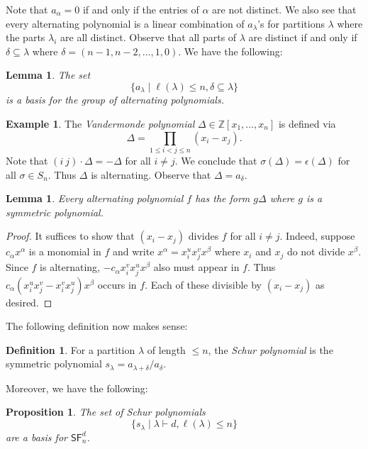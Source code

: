 \documentclass[12pt]{article}
\theoremstyle{plain}
\newtheorem{lemma}[theorem]{Lemma}
\newtheorem{proposition}[theorem]{Proposition}
\theoremstyle{definition}
\newtheorem{definition}[theorem]{Definition}
\newtheorem{example}[theorem]{Example}
\theoremstyle{remark}
\numberwithin{equation}{section}
\begin{document}
Note that $a_\alpha=0$ if and only if the entries of $\alpha$ are
not distinct.  We also see that every alternating polynomial is a linear
combination of $a_\lambda$'s for partitions $\lambda$ where the parts
$\lambda_i$ are all distinct.
Observe that all parts of $\lambda$ are distinct if and only if
$\delta \subseteq \lambda$ where
$\delta=(n-1,n-2,\ldots,1,0)$.
We have the following:

\begin{lemma}
The set
\[
\{ a_\lambda \mid \ell(\lambda) \le n, \delta \subseteq \lambda \}
\]
is a basis for the group of alternating polynomials.
\end{lemma}

\begin{example}
The \emph{Vandermonde polynomial} $\Delta \in \mathbb{Z}[x_1,\ldots,x_n]$
is defined via
\[
\Delta = \prod_{1 \le i < j \le n} (x_i-x_j).
\]
Note that $(i\ j) \cdot \Delta = -\Delta$ for all $i \ne j$.
We conclude that $\sigma(\Delta) = \epsilon(\Delta)$
for all $\sigma \in S_n$.
Thus $\Delta$ is alternating.
Observe that $\Delta=a_\delta$.
\end{example}

\begin{lemma}
Every alternating polynomial $f$ has the form $g \Delta$
where $g$ is a symmetric polynomial. 
\end{lemma}

\begin{proof}
It suffices to show that $(x_i-x_j)$ divides $f$ for all $i \ne j$.
Indeed, suppose $c_\alpha x^\alpha$ is a monomial in $f$
and write $x^\alpha = x_i^u x_j^v x^\beta$ where $x_i$ and $x_j$
do not divide $x^\beta$.
Since $f$ is alternating, $-c_\alpha x_i^v x_j^u x^\beta$
also must appear in $f$.
Thus $c_\alpha (x_i^u x_j^v - x_i^v x_j^u) x^\beta$ occurs in $f$.
Each of these divisible by $(x_i-x_j)$ as desired.
\end{proof}

The following definition now makes sense:

\begin{definition}
For a partition $\lambda$ of length $\le n$, the \emph{Schur polynomial}
is the symmetric polynomial
$s_\lambda = a_{\lambda+\delta}/a_\delta$.
\end{definition}

Moreover, we have the following:

\begin{proposition}
The set of Schur polynomials
\[
\{ s_\lambda \mid \lambda \vdash d, \ell(\lambda) \le n \}
\]
are a basis for $\mathsf{SF}^d_n$.
\end{proposition}
\end{document}
